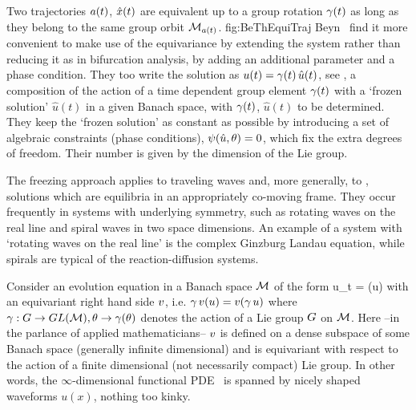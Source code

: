 \begin{description}
{}{
Two trajectories
$a(t)$, $\hat{x}(t)$ are equivalent up to a group rotation
$\gamma(t)$ as long as they belong to the same group orbit
${\cal M}_{a(t)}$.
}
{fig:BeThEquiTraj}
%
Beyn~\etal{} find it more convenient to make
use of the equivariance by extending the system rather than
reducing it as in bifurcation analysis, by adding an additional
parameter and a phase condition. They too write the solution as
${u}(t) = \gamma(t)\,\hat{u}(t)$, see
, a composition of the action of a
time dependent group element $\gamma(t)$ with a `frozen
solution' $\hat{u}(t)$ in a given Banach space, with
$\gamma(t)$, $\hat{u}(t)$ to be determined. They keep the
`frozen solution' as constant as
possible%
 by introducing a set of algebraic constraints
(phase conditions), $\psi(\hat{u}, {\bf \theta}) = 0$, which fix the
extra degrees of freedom. Their number is given by the
dimension of the Lie group.


The freezing approach applies to traveling
waves and, more generally, to \reqva{},
solutions which are
equilibria in an appropriately co-moving frame. They occur
frequently in systems with underlying symmetry, such as
rotating waves on the real line and spiral waves in two space
dimensions. An example of a system with `rotating waves on the
real line' is the complex Ginzburg Landau equation, while
spirals are typical of the reaction-diffusion systems.

Consider an evolution equation in a Banach space ${\cal M}$  of the form
\beq
u_t = \vel(u)
with an equivariant right hand side $v$, i.e.
$\gamma\,v(u) = v(\gamma\,u)$ where $\gamma : G \to
GL({\cal M}), {\bf \theta} \to \gamma({\bf \theta})$ denotes the action of a
Lie group $G$ on  ${\cal M}$. Here --in the parlance of applied
mathematicians-- $v$ is defined on a dense subspace of some
Banach space (generally infinite dimensional) and is
equivariant with respect to the action of a finite dimensional
(not necessarily compact) Lie group. In other words, the
$\infty$-dimensional functional PDE \statesp\ is spanned by
nicely shaped waveforms $u(x)$, nothing too kinky.


\end{description}
